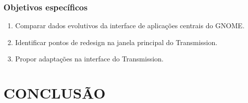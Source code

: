 \documentclass[
    12pt,               %
    openright,          %
    oneside,            %
    a4paper,            %
    chapter=TITLE,      %
    section=TITLE,      %
    brazil              %
]{abntex2}
\begin{document}
\subsection{Objetivos específicos}

\begin{enumerate}
  \item Comparar dados evolutivos da interface de aplicações centrais do GNOME.
  \item Identificar pontos de redesign na janela principal do Transmission.
  \item Propor adaptações na interface do Transmission.
\end{enumerate}







\chapter{CONCLUSÃO}



\label{nropaginas}

\printindex
\end{document}
